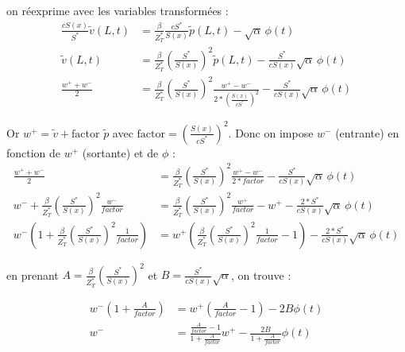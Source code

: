 \documentclass[12pt,a4paper]{article}
\begin{document}
on réexprime avec les variables transformées :
\begin{equation}
    \begin{align}
        \frac{cS(x)}{S^\ast} \tilde{v}(L,t) &= \frac{\beta}{Z^\ast_T} \frac{cS^\ast}{S(x)} \tilde{p}(L,t) - \sqrt{\alpha}\,\phi(t) \\
        \tilde{v}(L,t) &= \frac{\beta}{Z^\ast_T} \left(\frac{S^\ast}{S(x)}\right)^2 \tilde{p}(L,t) - \frac{S^\ast}{c S(x)} \sqrt{\alpha}\,\phi(t) \\
        \frac{w^+ + w^-}{2} &= \frac{\beta}{Z^\ast_T} \left(\frac{S^\ast}{S(x)}\right)^2 \frac{w^+ - w^-}{2*\left(\frac{S(x)}{cS^\ast}\right)^2} - \frac{S^\ast}{c S(x)} \sqrt{\alpha}\,\phi(t)
    \end{align}
\end{equation}

Or $w^+=\tilde{v}+ \text{factor }\tilde{p}$ avec $\text{factor} = \left(\frac{S(x)}{c S^\ast}\right)^2$.
Donc on impose $w^-$ (entrante) en fonction de $w^+$ (sortante) et de $\phi$ :
\begin{equation}
    \begin{align}
        \frac{w^+ + w^-}{2} &= \frac{\beta}{Z^\ast_T} \left(\frac{S^\ast}{S(x)}\right)^2 \frac{w^+ - w^-}{2*factor} - \frac{S^\ast}{c S(x)} \sqrt{\alpha}\,\phi(t) \\
        w^- +  \frac{\beta}{Z^\ast_T} \left(\frac{S^\ast}{S(x)}\right)^2 \frac{w^-}{factor} &= \frac{\beta}{Z^\ast_T} \left(\frac{S^\ast}{S(x)}\right)^2 \frac{w^+}{factor} - w^+ - \frac{2*S^\ast}{c S(x)} \sqrt{\alpha}\,\phi(t) \\
        w^- \left(1 + \frac{\beta}{Z^\ast_T} \left(\frac{S^\ast}{S(x)}\right)^2 \frac{1}{factor}\right) &= w^+ \left(\frac{\beta}{Z^\ast_T} \left(\frac{S^\ast}{S(x)}\right)^2 \frac{1}{factor} - 1\right) - \frac{2*S^\ast}{c S(x)} \sqrt{\alpha}\,\phi(t) 
    \end{align}
\end{equation}

en prenant $A = \frac{\beta}{Z^\ast_T} \left(\frac{S^\ast}{S(x)}\right)^2$ et $B = \frac{S^\ast}{c S(x)} \sqrt{\alpha}$, on trouve :

\begin{equation}
    \begin{align}
        w^- \left(1 + \frac{A}{factor}\right) &= w^+ \left(\frac{A}{factor} - 1\right) - 2B \phi(t) \\
        w^- &= \frac{\frac{A}{factor} - 1}{1 + \frac{A}{factor}} w^+ - \frac{2B}{1 + \frac{A}{factor}} \phi(t)
    \end{align}
\end{equation}
\end{document}
